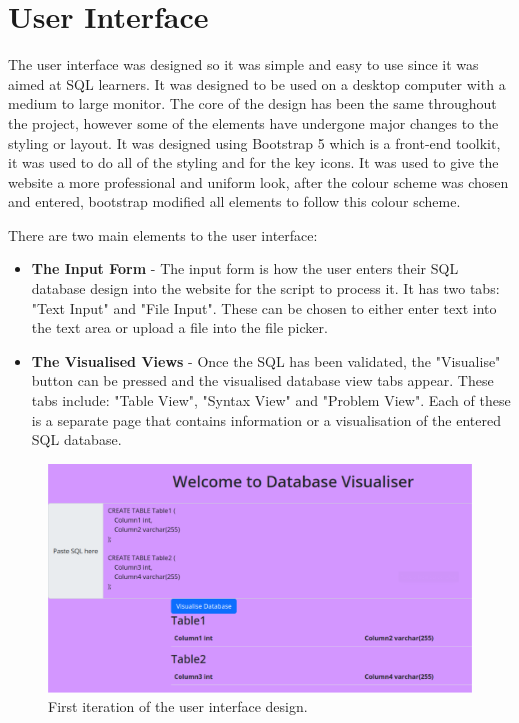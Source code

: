 \newpage

\section{User Interface}

The user interface was designed so it was simple and easy to use since it was aimed at SQL learners. It was designed to be used on a desktop computer with a medium to large monitor. The core of the design has been the same throughout the project, however some of the elements have undergone major changes to the styling or layout. It was designed using Bootstrap 5 \cite{Bootstrap} which is a front-end toolkit, it was used to do all of the styling and for the key icons. It was used to give the website a more professional and uniform look, after the colour scheme was chosen and entered, bootstrap modified all elements to follow this colour scheme.

There are two main elements to the user interface: 

\begin{itemize}
	\item \textbf{The Input Form} - The input form is how the user enters their SQL database design into the website for the script to process it. It has two tabs: "Text Input" and "File Input". These can be chosen to either enter text into the text area or upload a file into the file picker.
	\item \textbf{The Visualised Views} - Once the SQL has been validated, the "Visualise" button can be pressed and the visualised database view tabs appear. These tabs include: "Table View", "Syntax View" and "Problem View". Each of these is a separate page that contains information or a visualisation of the entered SQL database.
\end{itemize}

\begin{figure}[h!]
	\centering
	\includegraphics[width=\textwidth]{firstDesign}
	\caption{First iteration of the user interface design.}
	\label{fig:firstDesign}
\end{figure}

